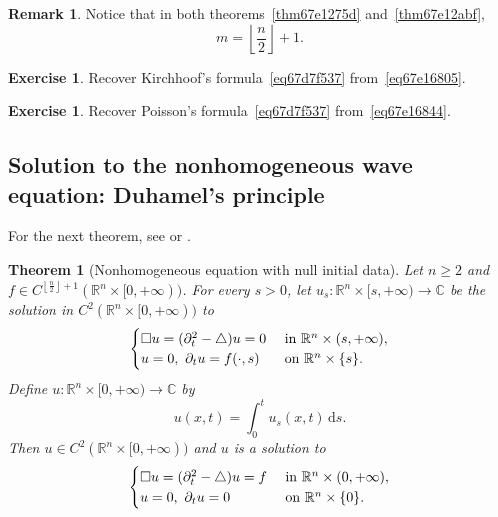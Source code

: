 \documentclass[a4paper,9pt]{amsart}
\newcommand{\R}{\mathbb{R}}	%
\newcommand{\C}{\mathbb{C}}	%
\newcommand{\did}{\,\mathrm{d}}	%
\newcommand{\de}{\partial}		%
\newcommand{\laplacian}{\triangle}
\theoremstyle{plain}
\newtheorem{theorem}[proposition]{Theorem}
\theoremstyle{definition}
\newtheorem{remark}[proposition]{Remark}
\newtheorem{exercise}[proposition]{Exercise}%
\theoremstyle{remark}
\begin{document}
\begin{remark}
	Notice that in both theorems~\ref{thm67e1275d} and~\ref{thm67e12abf},
	\begin{equation}
		m = \left\lfloor \frac{n}{2} \right\rfloor + 1 .
	\end{equation}
\end{remark}

\begin{exercise}
	Recover Kirchhoof's formula~\eqref{eq67d7f537} from~\eqref{eq67e16805}.
\end{exercise}

\begin{exercise}
	Recover Poisson's formula~\eqref{eq67d7f537} from~\eqref{eq67e16844}.
\end{exercise}

\subsection{Solution to the nonhomogeneous wave equation: Duhamel's principle}\label{subs67e12d15}

For the next theorem, see \cite[Th. 5.25, page 175]{MR1357411} or \cite[Th. 2.4.4, page 81]{MR2597943}.
\begin{theorem}[Nonhomogeneous equation with null initial data]\label{thm67e131b9}
	Let $n\ge2$ and $f\in C^{\left\lfloor \frac{n}{2} \right\rfloor + 1} (\R^n\times[0,+\infty))$.
	For every $s>0$, let $u_s:\R^n\times[s,+\infty)\to\C$ be the solution 
	in $C^2(\R^n\times[0,+\infty))$ to 
	\begin{equation}
	\begin{cases}
		\waveop u = ( \de_t^2-\laplacian )u = 0 & \text{ in }\R^n\times(s,+\infty) , \\
		u = 0,\ \de_t u = f(\cdot,s) & \text{ on }\R^n\times\{s\} .
	\end{cases}
	\end{equation}
	Define $u:\R^n\times[0,+\infty)\to\C$ by
	\begin{equation}
		u(x,t) = \int_0^t u_s(x,t) \did s .
	\end{equation}
	Then $u\in C^2(\R^n\times[0,+\infty))$ and $u$ is a solution to
	\begin{equation}
	\begin{cases}
		\waveop u = ( \de_t^2-\laplacian )u = f & \text{ in }\R^n\times(0,+\infty) , \\
		u = 0,\ \de_t u = 0 & \text{ on }\R^n\times\{0\} .
	\end{cases}
	\end{equation}
\end{theorem}
\end{document}
